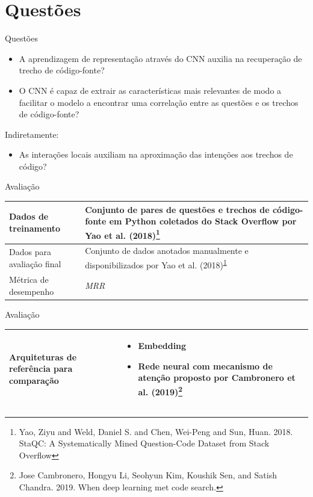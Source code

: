 \documentclass[10pt]{beamer}
\begin{document}
\section{Questões}


\begin{frame}{Questões}
	\begin{itemize}
	    \item A aprendizagem de representação através do CNN auxilia na recuperação de trecho de código-fonte?
	    \item O CNN é capaz de extrair as características mais relevantes de modo a facilitar o modelo a encontrar uma correlação entre as questões e os trechos de código-fonte?
	\end{itemize}
	Indiretamente:
	\begin{itemize}
	    \item As interações locais auxiliam na aproximação das intenções aos trechos de código?
	\end{itemize}
\end{frame}

\begin{frame}{Avaliação}
   \begin{center}
       \begin{tabular}{|p{4cm}|p{4cm}|}
            \hline
            Dados de treinamento & Conjunto de pares de questões e trechos de código-fonte em Python coletados do Stack Overflow por Yao et al. (2018)\footnote{\label{foot:yao-staqc}Yao, Ziyu and Weld, Daniel S. and Chen, Wei-Peng and Sun, Huan. 2018. StaQC: A Systematically Mined Question-Code Dataset from Stack Overflow} \\ 
            \hline
            Dados para avaliação final & Conjunto de dados anotados manualmente e disponibilizados por Yao et al. (2018)\textsuperscript{\ref{foot:yao-staqc}} \\
            \hline
            Métrica de desempenho & \emph{MRR} \\
            
            
            \hline
       \end{tabular}
   \end{center}
\end{frame}

\begin{frame}{Avaliação}
   \begin{center}
       \begin{tabular}{|p{4cm}|p{4cm}|}
       \hline
            Arquiteturas de referência para comparação & \begin{itemize}
                \item Embedding
                \item Rede neural com mecanismo de atenção proposto por Cambronero et al. (2019)\footnote{Jose Cambronero, Hongyu Li, Seohyun Kim, Koushik Sen, and Satish Chandra. 2019. When deep learning met code search.}
            \end{itemize} \\
            
            \hline
       \end{tabular}
   \end{center}
\end{frame}
\end{document}

